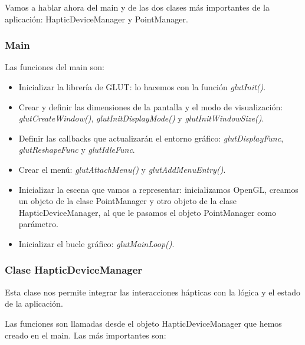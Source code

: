 \documentclass[a4paper,11pt, oneside]{book}
\begin{document}
Vamos a hablar ahora del main y de las dos clases más importantes de la aplicación: HapticDeviceManager y PointManager.

\subsubsection{Main}

Las funciones del main son:
\begin{itemize}
	\item Inicializar la librería de GLUT: lo hacemos con la función \textit{glutInit()}.
	\item Crear y definir las dimensiones de la pantalla y el modo de visualización: \textit{glutCreateWindow()}, \textit{glutInitDisplayMode()} y \textit{glutInitWindowSize()}.
	\item Definir las callbacks que actualizarán el entorno gráfico: \textit{glutDisplayFunc}, \textit{glutReshapeFunc} y \textit{glutIdleFunc}. 
	\item Crear el menú: \textit{glutAttachMenu()} y \textit{glutAddMenuEntry()}.
	\item Inicializar la escena que vamos a representar: inicializamos OpenGL, creamos un objeto de la clase PointManager y otro objeto de la clase HapticDeviceManager, al que le pasamos el objeto PointManager como parámetro.
	\item Inicializar el bucle gráfico: \textit{glutMainLoop()}.
\end{itemize}




\subsubsection{Clase HapticDeviceManager}

Esta clase nos permite integrar las interacciones hápticas con la lógica y el estado de la aplicación.

Las funciones son llamadas desde el objeto HapticDeviceManager que hemos creado en el main. Las más importantes son:
\end{document}
